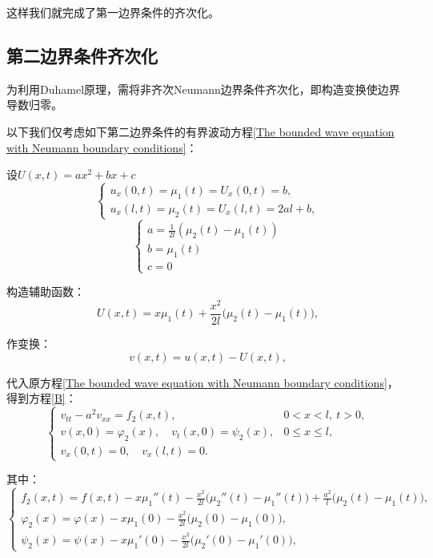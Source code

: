 \documentclass[12pt,a4paper]{article}
\numberwithin{subsection}{section}   %
\numberwithin{subsubsection}{subsection}
\theoremstyle{plain}
\theoremstyle{definition}
\theoremstyle{remark}
\theoremstyle{remark}
\begin{document}
	这样我们就完成了第一边界条件的齐次化。
	
	\subsection{第二边界条件齐次化}
	为利用Duhamel原理，需将非齐次Neumann边界条件齐次化，即构造变换使边界导数归零。

		
		以下我们仅考虑如下第二边界条件的有界波动方程\eqref{The bounded wave equation with Neumann boundary conditions}：
		
		设$U(x, t)=ax^2+bx+c$
		\[
		\begin{cases}
			u_x(0, t) = \mu_1(t) = U_x(0, t) = b, \\
			u_x(l, t) = \mu_2(t) = U_x(l, t) = 2al + b,
		\end{cases}
		\]
		\[
		\begin{cases}
			a = \frac{1}{2l}(\mu_2(t) - \mu_1(t)) \\
			b = \mu_1(t) \\
			c = 0 
		\end{cases}
		\]
		
		构造辅助函数：
		\begin{equation}
			U(x, t) = x\mu_1(t) + \frac{x^2}{2l}\big( \mu_2(t) - \mu_1(t) \big),
		\end{equation}
		
		作变换：
		\begin{equation}
			v(x, t) = u(x, t) - U(x, t),
		\end{equation}
		
		代入原方程\eqref{The bounded wave equation with Neumann boundary conditions}，
		得到方程\eqref{B}：
	    \begin{equation}\label{B}
		\begin{cases}
			v_{tt} - a^2 v_{xx} = f_2(x, t), & 0 < x < l, \ t > 0, \\
			v(x, 0) = \varphi_2(x), \quad v_t(x, 0) = \psi_2(x), & 0 \leq x \leq l, \\
			v_x(0, t) = 0, \quad v_x(l, t) = 0. &
		\end{cases}
	\end{equation}

其中：
		\begin{equation}
			\begin{cases}
				f_2(x, t) = f(x, t)-x\mu_1''(t) - \frac{x^2}{2l}\big( \mu_2''(t) - \mu_1''(t) \big) + \frac{a^2}{l}\big( \mu_2(t) - \mu_1(t) \big), \\
				\varphi_2(x) = \varphi(x) - x\mu_1(0) - \frac{x^2}{2l}\big( \mu_2(0) - \mu_1(0) \big), \\
			\psi_2(x) = \psi(x) - x\mu_1'(0) - \frac{x^2}{2l}\big( \mu_2'(0) - \mu_1'(0) \big), 
			\end{cases}
		\end{equation}
		
\end{document}
